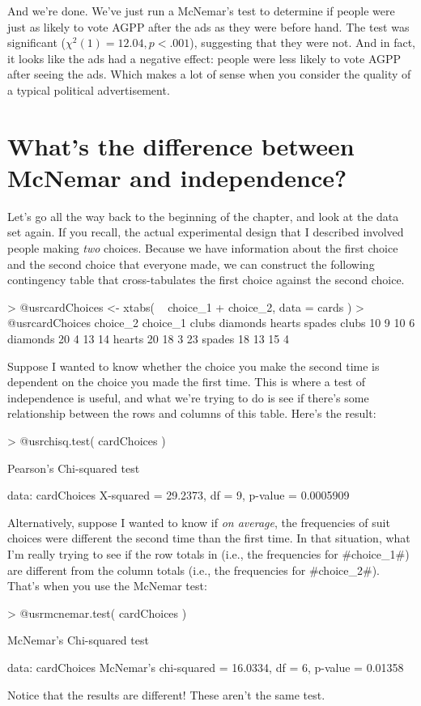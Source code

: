 And we're done. We've just run a McNemar's test to determine if people were just as likely to vote AGPP after the ads as they were before hand. The test was significant ($\chi^2(1) = 12.04, p<.001$), suggesting that they were not. And in fact, it looks like the ads had a negative effect: people were less likely to vote AGPP after seeing the ads. Which makes a lot of sense when you consider the quality of a typical political advertisement.


\section{What's the difference between McNemar and independence?}

Let's go all the way back to the beginning of the chapter, and look at the  data set again. If you recall, the actual experimental design that I described involved people making {\it two} choices. Because we have information about the first choice and the second choice that everyone made, we can construct the following contingency table that cross-tabulates the first choice against the second choice.
\begin{rblock1}
> @usr{cardChoices <- xtabs( ~ choice_1 + choice_2, data = cards )}
> @usr{cardChoices}
          choice_2
choice_1   clubs diamonds hearts spades
  clubs       10        9     10      6
  diamonds    20        4     13     14
  hearts      20       18      3     23
  spades      18       13     15      4
\end{rblock1}
Suppose I wanted to know whether the choice you make the second time is dependent on the choice you made the first time. This is where a test of independence is useful, and what we're trying to do is see if there's some relationship between the rows and columns of this table. Here's the result:
\begin{rblock1}
> @usr{chisq.test( cardChoices )}

	Pearson's Chi-squared test

data:  cardChoices
X-squared = 29.2373, df = 9, p-value = 0.0005909
\end{rblock1}

Alternatively, suppose I wanted to know if {\it on average}, the frequencies of suit choices were different the second time than the first time. In that situation, what I'm really trying to see if the row totals in  (i.e., the frequencies for \rtextverb#choice_1#) are different from the column totals (i.e., the frequencies for \rtextverb#choice_2#). That's when you use the McNemar test:
\begin{rblock1}
> @usr{mcnemar.test( cardChoices )}

	McNemar's Chi-squared test

data:  cardChoices
McNemar's chi-squared = 16.0334, df = 6, p-value = 0.01358
\end{rblock1}
Notice that the results are different! These aren't the same test. 



